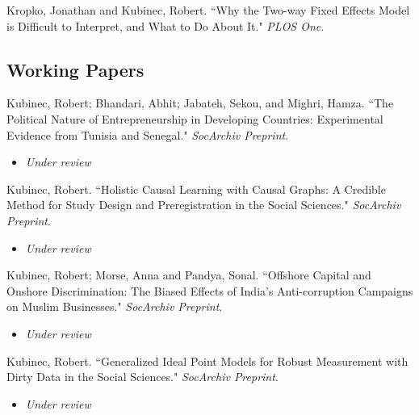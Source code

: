 \documentclass[11pt, a4paper]{article}
\newcommand{\years}[1]{\marginnote{\scriptsize #1}}
\begin{document}
\years{2020}Kropko, Jonathan and Kubinec, Robert. ``Why the Two-way Fixed Effects Model is Difficult to Interpret, and What to Do About It." \textit{PLOS One}. 

\subsection*{Working Papers}
\noindent

\years{2024} Kubinec, Robert; Bhandari, Abhit; Jabateh, Sekou, and Mighri, Hamza. ``The Political Nature of Entrepreneurship in Developing Countries: Experimental Evidence from Tunisia and Senegal." \emph{SocArchiv Preprint}. \\

\begin{itemize}
	\item \emph{Under review}
\end{itemize}

\years{2023} Kubinec, Robert. ``Holistic Causal Learning with Causal Graphs: A Credible Method for Study Design and Preregistration in the Social Sciences." \emph{SocArchiv Preprint}. \\

\begin{itemize}
	\item \emph{Under review}
\end{itemize}

\years{2023} Kubinec, Robert; Morse, Anna and Pandya, Sonal. ``Offshore Capital and Onshore Discrimination: The Biased Effects of India's Anti-corruption Campaigns on Muslim Businesses." \emph{SocArchiv Preprint}. \\

\begin{itemize}
	\item \emph{Under review}
\end{itemize}

\years{2024} Kubinec, Robert. ``Generalized Ideal Point Models for Robust Measurement with Dirty Data in the Social Sciences." \emph{SocArchiv Preprint}. \\

\begin{itemize}
	\item \emph{Under review}
\end{itemize}

\newpage
\end{document}
